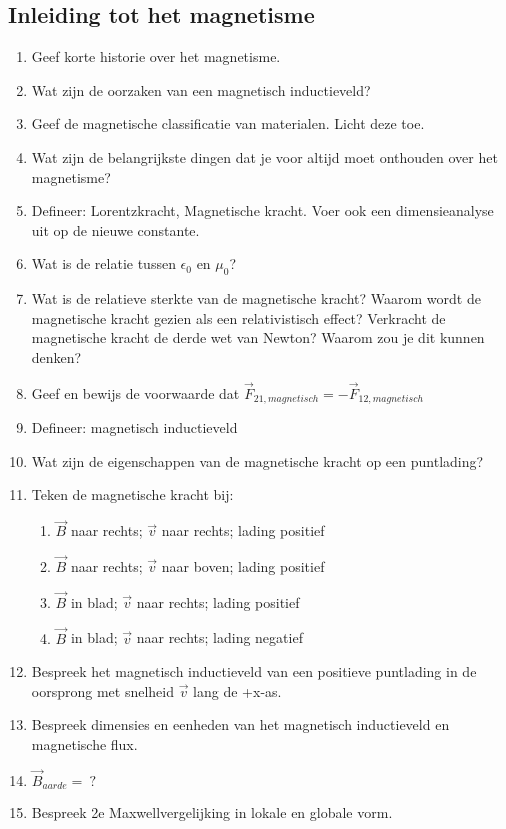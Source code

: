 \documentclass[12pt]{article}
\begin{document}
    \subsection{Inleiding tot het magnetisme}
    \begin{enumerate}
        \item Geef korte historie over het magnetisme.
        \item Wat zijn de oorzaken van een magnetisch inductieveld?
        \item Geef de magnetische classificatie van materialen. Licht deze toe.
        \item Wat zijn de belangrijkste dingen dat je voor altijd moet onthouden over het magnetisme?
        \item Defineer: Lorentzkracht, Magnetische kracht. Voer ook een dimensieanalyse uit op de nieuwe constante.
        \item Wat is de relatie tussen $\epsilon_0$ en $\mu_0$?
        \item Wat is de relatieve sterkte van de magnetische kracht? Waarom wordt de magnetische kracht gezien als een relativistisch effect? Verkracht de magnetische kracht de derde wet van Newton? Waarom zou je dit kunnen denken?
        \item Geef en bewijs de voorwaarde dat $\vec{F}_{21,magnetisch} = -\vec{F}_{12,magnetisch}$
        \item Defineer: magnetisch inductieveld
        \item Wat zijn de eigenschappen van de magnetische kracht op een puntlading?
            \item Teken de magnetische kracht bij: 
            \begin{enumerate}
                \item $\vec{B}$ naar rechts; $\vec{v}$ naar rechts; lading positief
                \item $\vec{B}$ naar rechts; $\vec{v}$ naar boven; lading positief
                \item $\vec{B}$ in blad; $\vec{v}$ naar rechts; lading positief
                \item $\vec{B}$ in blad; $\vec{v}$ naar rechts; lading negatief
            \end{enumerate}
        \item Bespreek het magnetisch inductieveld van een positieve puntlading in de oorsprong met snelheid $\vec{v}$ lang de +x-as. 
        \item Bespreek dimensies en eenheden van het magnetisch inductieveld en magnetische flux.
        \item $\vec{B}_{aarde} =\: ?$
        \item Bespreek 2e Maxwellvergelijking in lokale en globale vorm.
    \end{enumerate}
\end{document}
